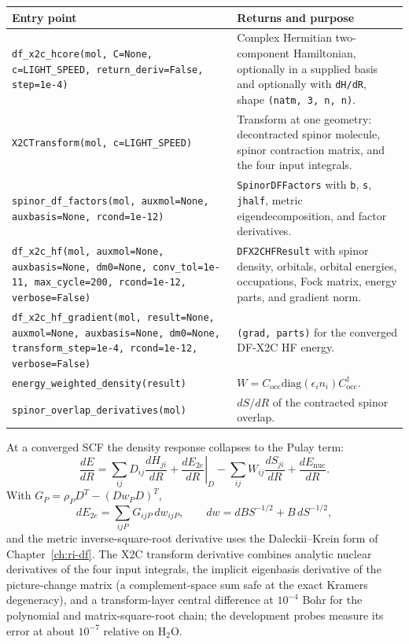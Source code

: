 \begin{center}
\small
\begin{tabularx}{\textwidth}{>{\raggedright\arraybackslash}p{}X}
\toprule
Entry point & Returns and purpose \\
\midrule
\texttt{df\_x2c\_hcore(mol, C=None, c=LIGHT\_SPEED,
  return\_deriv=False, step=1e-4)} &
  Complex Hermitian two-component Hamiltonian, optionally in a
  supplied basis and optionally with \texttt{dH/dR}, shape
  \texttt{(natm, 3, n, n)}. \\
\texttt{X2CTransform(mol, c=LIGHT\_SPEED)} &
  Transform at one geometry: decontracted spinor molecule, spinor
  contraction matrix, and the four input integrals. \\
\texttt{spinor\_df\_factors(mol, auxmol=None, auxbasis=None,
  rcond=1e-12)} &
  \texttt{SpinorDFFactors} with \texttt{b}, \texttt{s}, \texttt{jhalf},
  metric eigendecomposition, and factor derivatives. \\
\texttt{df\_x2c\_hf(mol, auxmol=None, auxbasis=None, dm0=None,
  conv\_tol=1e-11, max\_cycle=200, rcond=1e-12, verbose=False)} &
  \texttt{DFX2CHFResult} with spinor density, orbitals, orbital
  energies, occupations, Fock matrix, energy parts, and gradient norm. \\
\texttt{df\_x2c\_hf\_gradient(mol, result=None, auxmol=None,
  auxbasis=None, dm0=None, transform\_step=1e-4, rcond=1e-12,
  verbose=False)} &
  \texttt{(grad, parts)} for the converged DF-X2C HF energy. \\
\texttt{energy\_weighted\_density(result)} &
  $W=C_{\mathrm{occ}}\mathrm{diag}(\epsilon_i n_i)
   C_{\mathrm{occ}}^{\dagger}$. \\
\texttt{spinor\_overlap\_derivatives(mol)} &
  $dS/dR$ of the contracted spinor overlap. \\
\bottomrule
\end{tabularx}
\end{center}

At a converged SCF the density response collapses to the Pulay term:
\begin{equation}
  \frac{dE}{dR}
  = \sum_{ij}D_{ij}\frac{dH_{ji}}{dR}
  + \left.\frac{dE_{2e}}{dR}\right|_{D}
  - \sum_{ij}W_{ij}\frac{dS_{ji}}{dR}
  + \frac{dE_{\mathrm{nuc}}}{dR}.
  \label{eq:x2c-two-component-gradient}
\end{equation}
With $G_P=\rho_PD^{T}-(Dw_PD)^{T}$,
\begin{equation}
  dE_{2e}=\sum_{ijP}G_{ijP}\,dw_{ijP},
  \qquad
  dw=dBS^{-1/2}+B\,dS^{-1/2},
  \label{eq:x2c-two-component-dE}
\end{equation}
and the metric inverse-square-root derivative uses the
Daleckii--Krein form of Chapter~\ref{ch:ri-df}.  The X2C transform
derivative combines analytic nuclear derivatives of the four input
integrals, the implicit eigenbasis derivative of the picture-change
matrix (a complement-space sum safe at the exact Kramers degeneracy),
and a transform-layer central difference at $10^{-4}$ Bohr for the
polynomial and matrix-square-root chain; the development probes
measure its error at about $10^{-7}$ relative on H$_2$O.

